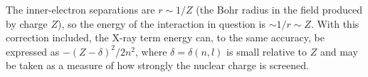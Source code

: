 The inner-electron separations are $r\sim1/Z$ (the Bohr radius in the field produced by charge $Z$), so the energy of the interaction in question is $\sim1/r\sim Z$. With this correction included, the X-ray term energy can, to the same accuracy, be expressed as $-(Z-\delta)^2/2n^2$, where $\delta=\delta(n,l)$ is small relative to $Z$ and may be taken as a measure of how strongly the nuclear charge is screened.
